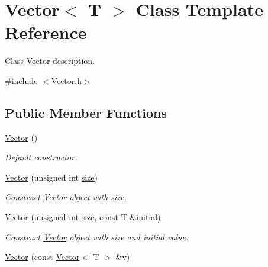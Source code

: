 \hypertarget{class_vector}{}\section{Vector$<$ T $>$ Class Template Reference}
\label{class_vector}


Class \hyperlink{class_vector}{Vector} description.  




{\ttfamily \#include $<$Vector.\+h$>$}

\subsection*{Public Member Functions}
\begin{DoxyCompactItemize}
\item 
\mbox{\label{class_vector_a39d6069675db4ecfc1ab81d440da759a}} 
\hyperlink{class_vector_a39d6069675db4ecfc1ab81d440da759a}{Vector} ()
\begin{DoxyCompactList}\small\item\em Default constructor. \end{DoxyCompactList}\item 
\mbox{\label{class_vector_aa698f24b3026321c71d7b77356359f00}} 
\hyperlink{class_vector_aa698f24b3026321c71d7b77356359f00}{Vector} (unsigned int \hyperlink{class_vector_a5214a382564aedc712b609416aa3b7b1}{size})
\begin{DoxyCompactList}\small\item\em Construct \hyperlink{class_vector}{Vector} object with size. \end{DoxyCompactList}\item 
\mbox{\label{class_vector_a17f59039935e4b09b64393e67e91b3c6}} 
\hyperlink{class_vector_a17f59039935e4b09b64393e67e91b3c6}{Vector} (unsigned int \hyperlink{class_vector_a5214a382564aedc712b609416aa3b7b1}{size}, const T \&initial)
\begin{DoxyCompactList}\small\item\em Construct \hyperlink{class_vector}{Vector} object with size and initial value. \end{DoxyCompactList}\item 
\mbox{\label{class_vector_aa1671acb623cf2259dd60cf81db4f56a}} 
\hyperlink{class_vector_aa1671acb623cf2259dd60cf81db4f56a}{Vector} (const \hyperlink{class_vector}{Vector}$<$ T $>$ \&v)

\end{DoxyCompactItemize}
